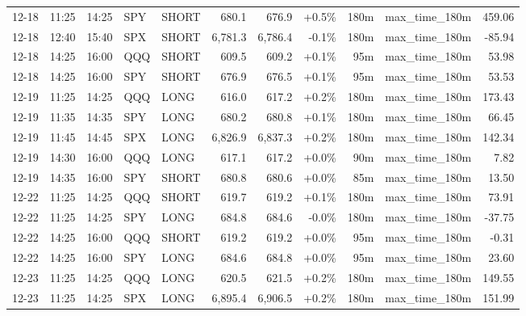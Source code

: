 \documentclass[11pt,a4paper,twoside]{article}
\begin{document}
\begin{center}
\begin{longtable}{>{\color{txtmain}}l l l l l r r r r >{\color{txtmain}}l r}
12-18 & 11:25 & 14:25 & SPY & SHORT & 680.1 & 676.9 & \textcolor{wingreen}{+0.5\%} & 180m & max\_time\_180m & \textcolor{wingreen}{459.06} \\
12-18 & 12:40 & 15:40 & SPX & SHORT & 6,781.3 & 6,786.4 & \textcolor{lossred}{-0.1\%} & 180m & max\_time\_180m & \textcolor{lossred}{-85.94} \\
12-18 & 14:25 & 16:00 & QQQ & SHORT & 609.5 & 609.2 & \textcolor{wingreen}{+0.1\%} & 95m & max\_time\_180m & \textcolor{wingreen}{53.98} \\
12-18 & 14:25 & 16:00 & SPY & SHORT & 676.9 & 676.5 & \textcolor{wingreen}{+0.1\%} & 95m & max\_time\_180m & \textcolor{wingreen}{53.53} \\
12-19 & 11:25 & 14:25 & QQQ & LONG & 616.0 & 617.2 & \textcolor{wingreen}{+0.2\%} & 180m & max\_time\_180m & \textcolor{wingreen}{173.43} \\
12-19 & 11:35 & 14:35 & SPY & LONG & 680.2 & 680.8 & \textcolor{wingreen}{+0.1\%} & 180m & max\_time\_180m & \textcolor{wingreen}{66.45} \\
12-19 & 11:45 & 14:45 & SPX & LONG & 6,826.9 & 6,837.3 & \textcolor{wingreen}{+0.2\%} & 180m & max\_time\_180m & \textcolor{wingreen}{142.34} \\
12-19 & 14:30 & 16:00 & QQQ & LONG & 617.1 & 617.2 & \textcolor{wingreen}{+0.0\%} & 90m & max\_time\_180m & \textcolor{wingreen}{7.82} \\
12-19 & 14:35 & 16:00 & SPY & SHORT & 680.8 & 680.6 & \textcolor{wingreen}{+0.0\%} & 85m & max\_time\_180m & \textcolor{wingreen}{13.50} \\
12-22 & 11:25 & 14:25 & QQQ & SHORT & 619.7 & 619.2 & \textcolor{wingreen}{+0.1\%} & 180m & max\_time\_180m & \textcolor{wingreen}{73.91} \\
12-22 & 11:25 & 14:25 & SPY & LONG & 684.8 & 684.6 & \textcolor{lossred}{-0.0\%} & 180m & max\_time\_180m & \textcolor{lossred}{-37.75} \\
12-22 & 14:25 & 16:00 & QQQ & SHORT & 619.2 & 619.2 & \textcolor{wingreen}{+0.0\%} & 95m & max\_time\_180m & \textcolor{lossred}{-0.31} \\
12-22 & 14:25 & 16:00 & SPY & LONG & 684.6 & 684.8 & \textcolor{wingreen}{+0.0\%} & 95m & max\_time\_180m & \textcolor{wingreen}{23.60} \\
12-23 & 11:25 & 14:25 & QQQ & LONG & 620.5 & 621.5 & \textcolor{wingreen}{+0.2\%} & 180m & max\_time\_180m & \textcolor{wingreen}{149.55} \\
12-23 & 11:25 & 14:25 & SPX & LONG & 6,895.4 & 6,906.5 & \textcolor{wingreen}{+0.2\%} & 180m & max\_time\_180m & \textcolor{wingreen}{151.99} \\

\end{longtable}
\end{center}
\end{document}
